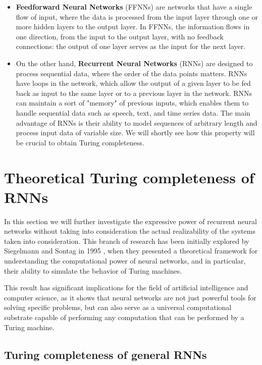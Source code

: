 \documentclass{article}
\begin{document}
\begin{itemize}
    \item \textbf{Feedforward Neural Networks} (FFNNs) are networks that have a single flow of input, where the data is processed from the input layer through one or more hidden layers to the output layer. In FFNNs, the information flows in one direction, from the input to the output layer, with no feedback connections: the output of one layer serves as the input for the next layer.

    \item On the other hand, \textbf{Recurrent Neural Networks} (RNNs) are designed to process sequential data, where the order of the data points matters. RNNs have loops in the network, which allow the output of a given layer to be fed back as input to the same layer or to a previous layer in the network. RNNs can maintain a sort of "memory" of previous inputs, which enables them to handle sequential data such as speech, text, and time series data. The main advantage of RNNs is their ability to model sequences of arbitrary length and process input data of variable size. We will shortly see how this property will be crucial to obtain Turing completeness.
\end{itemize}

\section{Theoretical Turing completeness of RNNs}\label{sec:theoretical}

In this section we will further investigate the expressive power of recurrent neural networks without taking into consideration the actual realizability of the systems taken into consideration. This branch of research has been initially explored by Siegelmann and Sontag in 1995 \cite{SIE95}, when they presented a theoretical framework for understanding the computational power of neural networks, and in particular, their ability to simulate the behavior of Turing machines.

This result has significant implications for the field of artificial intelligence and computer science, as it shows that neural networks are not just powerful tools for solving specific problems, but can also serve as a universal computational substrate capable of performing any computation that can be performed by a Turing machine.

\subsection{Turing completeness of general RNNs}
\end{document}
